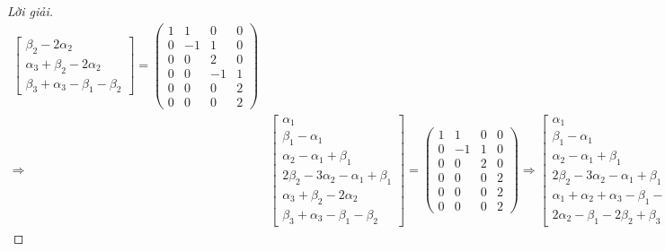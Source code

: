\documentclass[class=linearalgebra,crop=false]{standalone}
\begin{document}
\begin{proof}[Lời giải]
\begin{align*}
\begin{bmatrix}
            \beta_{2} - 2\alpha_{2} \\
            \alpha_{3} + \beta_{2} - 2\alpha_{2} \\
            \beta_{3} + \alpha_{3} - \beta_{1} - \beta_{2}
        \end{bmatrix}=
        \begin{pmatrix}
            1 & 1 & 0 & 0 \\
            0 & -1 & 1 & 0 \\
            0 & 0 & 2 & 0 \\
            0 & 0 & -1 & 1 \\
            0 & 0 & 0 & 2 \\
            0 & 0 & 0 & 2
        \end{pmatrix} \\
        \Longrightarrow&
        \begin{bmatrix}
            \alpha_{1} \\
            \beta_{1} - \alpha_{1} \\
            \alpha_{2} - \alpha_{1} + \beta_{1} \\
            2\beta_{2} - 3\alpha_{2} - \alpha_{1} + \beta_{1} \\
            \alpha_{3} + \beta_{2} - 2\alpha_{2} \\
            \beta_{3} + \alpha_{3} - \beta_{1} - \beta_{2}
        \end{bmatrix}=
        \begin{pmatrix}
            1 & 1 & 0 & 0 \\
            0 & -1 & 1 & 0 \\
            0 & 0 & 2 & 0 \\
            0 & 0 & 0 & 2 \\
            0 & 0 & 0 & 2 \\
            0 & 0 & 0 & 2
        \end{pmatrix}
        \Longrightarrow
        \begin{bmatrix}
            \alpha_{1} \\
            \beta_{1} - \alpha_{1} \\
            \alpha_{2} - \alpha_{1} + \beta_{1} \\
            2\beta_{2} - 3\alpha_{2} - \alpha_{1} + \beta_{1} \\
            \alpha_{1} + \alpha_{2} + \alpha_{3} - \beta_{1} - \beta_{2} \\
            2\alpha_{2} - \beta_{1} - 2\beta_{2} + \beta_{3}
        \end{bmatrix}=

\end{align*}
\end{proof}
\end{document}
